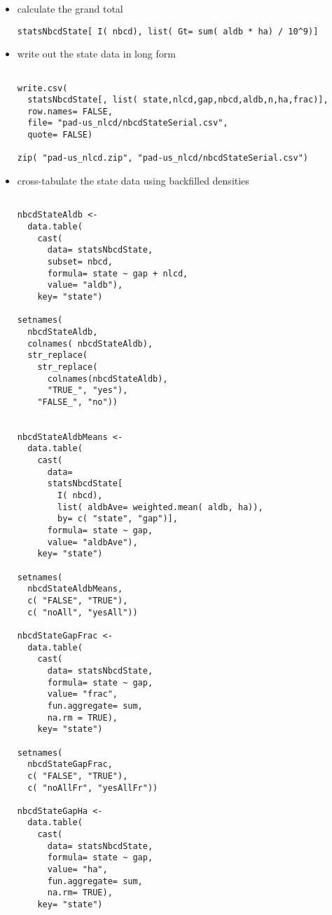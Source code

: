\documentclass[11pt]{article}
\begin{document}
\begin{itemize}
\begin{itemize}
\end{itemize} %

\item calculate the grand total\\
\label{sec-3-5-4-2}%
\begin{verbatim}
statsNbcdState[ I( nbcd), list( Gt= sum( aldb * ha) / 10^9)]
\end{verbatim}



\item write out the state data in long form\\
\label{sec-3-5-4-3}%
\begin{verbatim}

write.csv(
  statsNbcdState[, list( state,nlcd,gap,nbcd,aldb,n,ha,frac)],
  row.names= FALSE,
  file= "pad-us_nlcd/nbcdStateSerial.csv",
  quote= FALSE)

zip( "pad-us_nlcd.zip", "pad-us_nlcd/nbcdStateSerial.csv")
\end{verbatim}




\item cross-tabulate the state data using backfilled densities\\
\label{sec-3-5-4-4}%
\begin{verbatim}

nbcdStateAldb <- 
  data.table(
    cast(
      data= statsNbcdState,
      subset= nbcd,
      formula= state ~ gap + nlcd,
      value= "aldb"),
    key= "state")

setnames(
  nbcdStateAldb,
  colnames( nbcdStateAldb),
  str_replace(
    str_replace(
      colnames(nbcdStateAldb),
      "TRUE_", "yes"),
    "FALSE_", "no"))


nbcdStateAldbMeans <- 
  data.table(
    cast(
      data=
      statsNbcdState[
        I( nbcd),
        list( aldbAve= weighted.mean( aldb, ha)),
        by= c( "state", "gap")],
      formula= state ~ gap,
      value= "aldbAve"),
    key= "state")

setnames(
  nbcdStateAldbMeans,
  c( "FALSE", "TRUE"),
  c( "noAll", "yesAll"))

nbcdStateGapFrac <-
  data.table(
    cast(
      data= statsNbcdState,
      formula= state ~ gap,
      value= "frac",
      fun.aggregate= sum,
      na.rm = TRUE),
    key= "state")

setnames(
  nbcdStateGapFrac,
  c( "FALSE", "TRUE"),
  c( "noAllFr", "yesAllFr"))

nbcdStateGapHa <-
  data.table(
    cast(
      data= statsNbcdState,
      formula= state ~ gap,
      value= "ha",
      fun.aggregate= sum,
      na.rm= TRUE),
    key= "state")


\end{verbatim}
\end{itemize}
\end{document}
